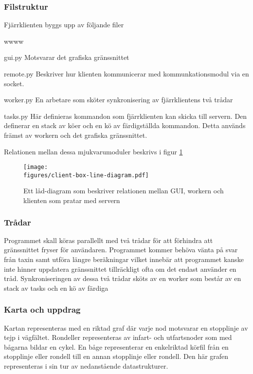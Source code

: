 \documentclass[tekniskrapport/tech.tex]{subfiles}
\begin{document}
\subsubsection{Filstruktur}
Fjärrklienten byggs upp av följande filer

\begin{labeling}{wwww}
	\item[gui.py] 	Motsvarar det grafiska gränssnittet
	
	\item[remote.py] Beskriver hur klienten kommunicerar med
		kommunkationsmodul via en socket.
	
	\item[worker.py] En arbetare som sköter synkronisering av
		fjärrklientens två trådar
	
	\item[tasks.py]	Här definieras kommandon som fjärrklienten kan skicka
		till servern.  Den definerar en stack av köer och en kö av
		färdigställda kommandon.  Detta används främst av workern och
		det grafiska gränssnittet.
\end{labeling}
Relationen mellan dessa mjukvarumoduler beskrivs i figur \ref{boxclient}

\begin{figure}[h]
\centering
	\texttt{[image: \\figures/client-box-line-diagram.pdf]}
	\caption{Ett låd-diagram som beskriver relationen mellan GUI,
	workern och klienten som pratar med servern}
	\label{boxclient}
\end{figure} 

\subsubsection{Trådar}
Programmet skall köras parallellt med två trådar för att förhindra att
gränssnittet fryser för användaren. Programmet kommer behöva vänta på svar från
taxin samt utföra längre beräkningar vilket innebär att programmet kanske inte
hinner uppdatera gränssnittet tillräckligt ofta om det endast använder en tråd.
Synkroniseringen av dessa två trådar sköts av en worker som består av
en stack av tasks och en kö av färdiga 

\subsubsection{Karta och uppdrag}
Kartan representeras med en riktad graf där varje nod motsvarar en stopplinje
av tejp i vägfältet. Rondeller representeras av infart- och utfartsnoder som
med bågarna bildar en cykel. En båge representerar en enkelriktad körfil från
en stopplinje eller rondell till en annan stopplinje eller rondell. Den här
grafen representeras i sin tur av nedanstående datastrukturer.
\end{document}
